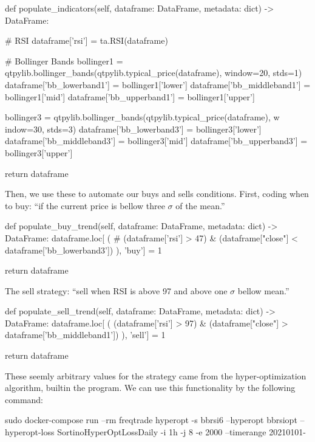 \documentclass[
12pt,				%
openright,			%
oneside,			%
a4paper,			%
brazil,				%
english,			  %
]{abntex2}
\begin{document}
\begin{python}
    def populate_indicators(self, dataframe: DataFrame, metadata: dict) -> DataFrame:

        # RSI
        dataframe['rsi'] = ta.RSI(dataframe)

        # Bollinger Bands
        bollinger1 = qtpylib.bollinger_bands(qtpylib.typical_price(dataframe), window=20, stds=1)
        dataframe['bb_lowerband1'] = bollinger1['lower']
        dataframe['bb_middleband1'] = bollinger1['mid']
        dataframe['bb_upperband1'] = bollinger1['upper']

        bollinger3 = qtpylib.bollinger_bands(qtpylib.typical_price(dataframe), w
indow=30, stds=3)
        dataframe['bb_lowerband3'] = bollinger3['lower']
        dataframe['bb_middleband3'] = bollinger3['mid']
        dataframe['bb_upperband3'] = bollinger3['upper']

        return dataframe
\end{python}

Then, we use these to automate our buys and sells conditions. First, coding when to buy: ``if the current price is bellow three $\sigma$ of the mean.'' 

\begin{python}
    def populate_buy_trend(self, dataframe: DataFrame, metadata: dict) -> DataFrame:
        dataframe.loc[
            (
                # (dataframe['rsi'] > 47) &
                (dataframe["close"] < dataframe['bb_lowerband3'])
            ),
            'buy'] = 1

        return dataframe
\end{python}

The sell strategy: ``sell when RSI is above 97 and above one $\sigma$ bellow mean.''

\begin{python}
    def populate_sell_trend(self, dataframe: DataFrame, metadata: dict) -> DataFrame:
        dataframe.loc[
            (
                (dataframe['rsi'] > 97) &
                (dataframe["close"] > dataframe['bb_middleband1'])
            ),
            'sell'] = 1

        return dataframe
\end{python}

These seemly arbitrary values for the strategy came from the hyper-optimization algorithm, builtin the program. We can use this functionality by the following command:

\begin{shell}
sudo docker-compose run --rm freqtrade hyperopt -s bbrsi6 --hyperopt bbrsiopt --hyperopt-loss SortinoHyperOptLossDaily -i 1h -j 8 -e 2000 --timerange 20210101-
\end{shell}
\end{document}
